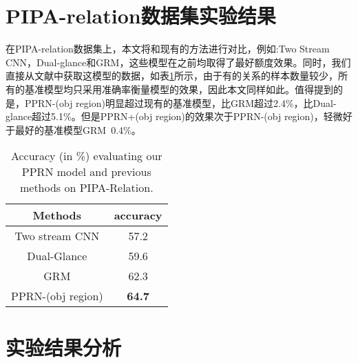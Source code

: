 \section{PIPA-relation数据集实验结果}

在PIPA-relation数据集上，本文将和现有的方法进行对比，例如:Two Stream CNN\cite{sun2017a}，Dual-glance\cite{li2017dual-glance}和GRM\cite{wang2018deep}，这些模型在之前均取得了最好额度效果。同时，我们直接从文献中获取这模型的数据，如表\ref{tab:exp-pipa-table}所示，由于有的关系的样本数量较少，所有的基准模型均只采用准确率衡量模型的效果，因此本文同样如此。值得提到的是，PPRN-(obj region)明显超过现有的基准模型，比GRM超过2.4\%，比Dual-glance超过5.1\%。但是PPRN+(obj region)的效果次于PPRN-(obj region)，轻微好于最好的基准模型GRM~0.4\%。
\begin{table}[htpb]
  \centering
  \caption{Accuracy (in \%) evaluating our PPRN model and previous methods on PIPA-Relation.}
   \vspace*{-3.5pt}
  \label{tab:exp-pipa-table}
  \begin{tabular}{c|c}
    \toprule
    Methods & accuracy \\
    \midrule
    Two stream CNN \cite{DBLP:conf/cvpr/ZhangPTFB15} & 57.2 \\
    \midrule
    Dual-Glance \cite{DBLP:conf/iccv/LiWZK17} & 59.6 \\
    \midrule
    GRM \cite{DBLP:conf/ijcai/WangCRYCL18} & 62.3 \\
    \midrule
    PPRN-(obj region) & \textbf{64.7} \\
    \bottomrule
  \end{tabular}
\end{table}

\section{实验结果分析}


